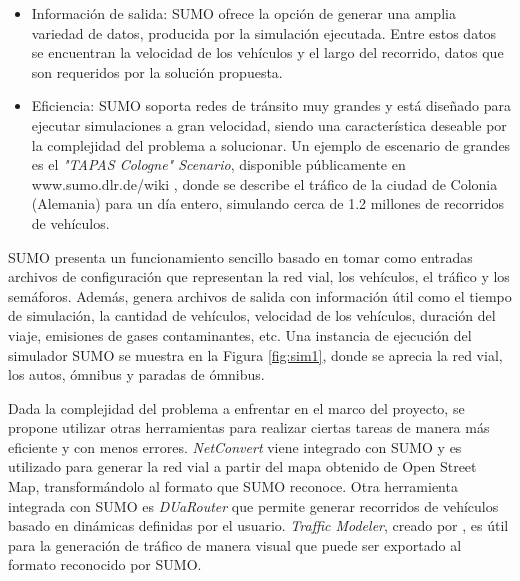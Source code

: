 \begin{itemize}
	\item Información de salida: SUMO ofrece la opción de generar una amplia variedad de datos, producida por la simulación ejecutada. Entre estos datos se encuentran la velocidad de los vehículos y el largo del recorrido, datos que son requeridos por la solución propuesta.
	
	\item Eficiencia: SUMO soporta redes de tránsito muy grandes y está diseñado para ejecutar simulaciones a gran velocidad, siendo una característica deseable por la complejidad del problema a solucionar. Un ejemplo de escenario de grandes es el \emph{"TAPAS Cologne" Scenario}, disponible públicamente en www.sumo.dlr.de/wiki , donde se describe el tráfico de la ciudad de Colonia (Alemania)  para un día entero, simulando cerca de 1.2 millones de recorridos de vehículos.
	
\end{itemize}


SUMO presenta un funcionamiento sencillo basado en tomar como entradas archivos de configuración que representan la red vial, los vehículos, el tráfico y los semáforos. Además, genera archivos de salida con información útil como el tiempo de simulación, la cantidad de vehículos, velocidad de los vehículos, duración del viaje, emisiones de gases contaminantes, etc. Una instancia de ejecución del simulador SUMO se muestra en la Figura \ref{fig:sim1}, donde se aprecia la red vial, los autos, ómnibus y paradas de ómnibus.

Dada la complejidad del problema a enfrentar en el marco del proyecto, se propone utilizar otras herramientas para realizar ciertas tareas de manera más eficiente y con menos errores. \emph{NetConvert} viene integrado con SUMO y es utilizado para generar la red vial a partir del mapa obtenido de Open Street Map, transformándolo al formato que SUMO reconoce. Otra herramienta integrada con SUMO es \emph{DUaRouter} que permite generar recorridos de vehículos basado en dinámicas definidas por el usuario. \emph{Traffic Modeler}, creado por \citet{TrafficModeler}, es útil para la generación de tráfico de manera visual que puede ser exportado al formato reconocido por SUMO. 
	


